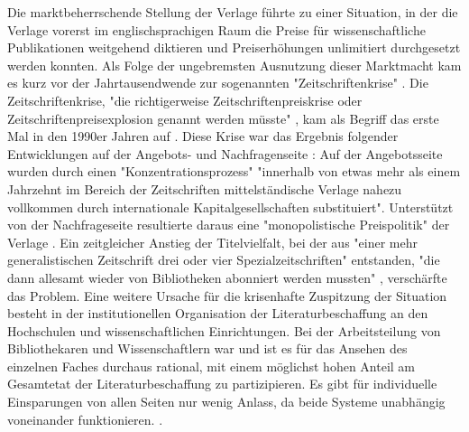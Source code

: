 Die marktbeherrschende Stellung der Verlage führte zu einer Situation, in der die Verlage vorerst im englischsprachigen Raum die Preise für wissenschaftliche Publikationen weitgehend diktieren und Preiserhöhungen unlimitiert durchgesetzt werden konnten. Als Folge der ungebremsten Ausnutzung dieser Marktmacht kam es kurz vor der Jahrtausendwende zur sogenannten "Zeitschriftenkrise"  \cite{Martin_2013} \cite{muller_2010_open} \cite{schirmbacher_2009_wisspub} \cite{Parks_2002_acadamic_faust}. Die Zeitschriftenkrise, "die richtigerweise Zeitschriftenpreiskrise oder Zeitschriftenpreisexplosion genannt werden müsste" \cite {Brintzinger_2010}, kam als Begriff das erste Mal in den 1990er Jahren auf \cite{Boni_2010}. Diese Krise war das Ergebnis folgender Entwicklungen auf der Angebots- und Nachfragenseite \cite{Brintzinger_2010}: Auf der Angebotsseite wurden durch einen "Konzentrationsprozess" "innerhalb von etwas mehr als einem Jahrzehnt im Bereich der Zeitschriften mittelständische Verlage nahezu vollkommen durch internationale Kapitalgesellschaften substituiert". \cite{Brintzinger_2010} Unterstützt von der Nachfrageseite resultierte daraus eine "monopolistische Preispolitik" der Verlage \cite{Brintzinger_2010}. Ein zeitgleicher Anstieg der Titelvielfalt, bei der aus "einer mehr generalistischen Zeitschrift drei oder vier Spezialzeitschriften" entstanden, "die dann allesamt wieder von Bibliotheken abonniert werden mussten" \cite{Brintzinger_2010}, verschärfte das Problem. Eine weitere Ursache für die krisenhafte Zuspitzung der Situation besteht in der institutionellen Organisation der Literaturbeschaffung an den Hochschulen und wissenschaftlichen Einrichtungen. Bei der Arbeitsteilung von Bibliothekaren und Wissenschaftlern war und ist es für das Ansehen des einzelnen Faches durchaus rational, mit einem möglichst hohen Anteil am Gesamtetat der Literaturbeschaffung zu partizipieren. Es gibt für individuelle Einsparungen von allen Seiten nur wenig Anlass, da beide Systeme unabhängig voneinander funktionieren. \cite{Brintzinger_2010}.

